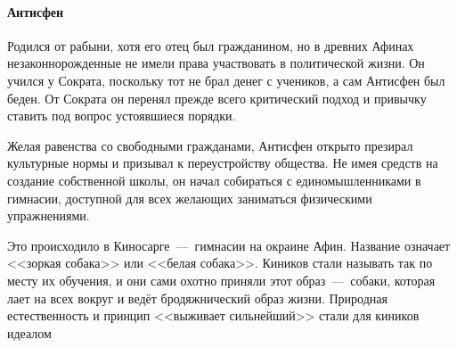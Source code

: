 
\paragraph{Антисфен} Родился от рабыни, хотя его отец был гражданином, но в древних Афинах незаконнорожденные не имели права участвовать в политической жизни. Он учился у Сократа, поскольку тот не брал денег с учеников, а сам Антисфен был беден. От Сократа он перенял прежде всего критический подход и привычку ставить под вопрос устоявшиеся порядки.

Желая равенства со свободными гражданами, Антисфен открыто презирал культурные нормы и призывал к переустройству общества. Не имея средств на создание собственной школы, он начал собираться с единомышленниками в гимнасии, доступной для всех желающих заниматься физическими упражнениями. 

Это происходило в Киносарге~---~гимнасии на окраине Афин. Название означает <<зоркая собака>> или <<белая собака>>.
Киников стали называть так по месту их обучения, и они сами охотно приняли этот образ~---~собаки, которая лает на всех вокруг и ведёт бродяжнический образ жизни. Природная естественность и принцип <<выживает сильнейший>> стали для киников идеалом

